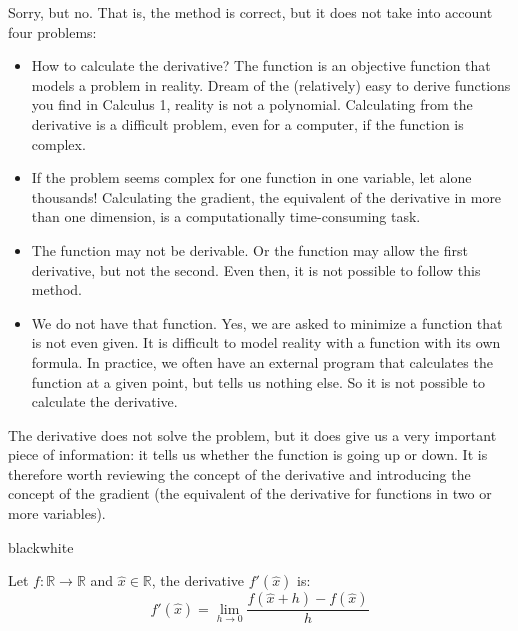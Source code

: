 Sorry, but no. That is, the method is correct, but it does not take into account four problems:
\begin{itemize}
    \setlength\itemsep{.5em}

    \item How to calculate the derivative? The function is an objective function that models a problem in reality. Dream of the (relatively) easy to derive functions you find in Calculus 1, reality is not a polynomial. Calculating from the derivative is a difficult problem, even for a computer, if the function is complex. 
    
    \item If the problem seems complex for one function in one variable, let alone thousands! Calculating the gradient, the equivalent of the derivative in more than one dimension, is a computationally time-consuming task.
    
    \item The function may not be derivable. Or the function may allow the first derivative, but not the second. Even then, it is not possible to follow this method.
    
    \item We do not have that function. Yes, we are asked to minimize a function that is not even given. 
    It is difficult to model reality with a function with its own formula. In practice, we often have an external program that calculates the function at a given point, but tells us nothing else. So it is not possible to calculate the derivative.
\end{itemize}

The derivative does not solve the problem, but it does give us a very important piece of information: it tells us whether the function is going up or down. It is therefore worth reviewing the concept of the derivative and introducing the concept of the gradient (the equivalent of the derivative for functions in two or more variables). 


\begin{remark}{black}{white}
    \begin{definition}[Derivative]
        Let \( f : \mathbb{R} \rightarrow \mathbb{R} \) and \( \widehat{x} \in \mathbb{R} \), the derivative \( f'(\widehat{x}) \) is:
        \[
            f'(\widehat{x}) = \lim_{h \rightarrow 0} \frac{f(\widehat{x} + h) - f(\widehat{x})}{h}
        \]
    \end{definition}
\end{remark}

